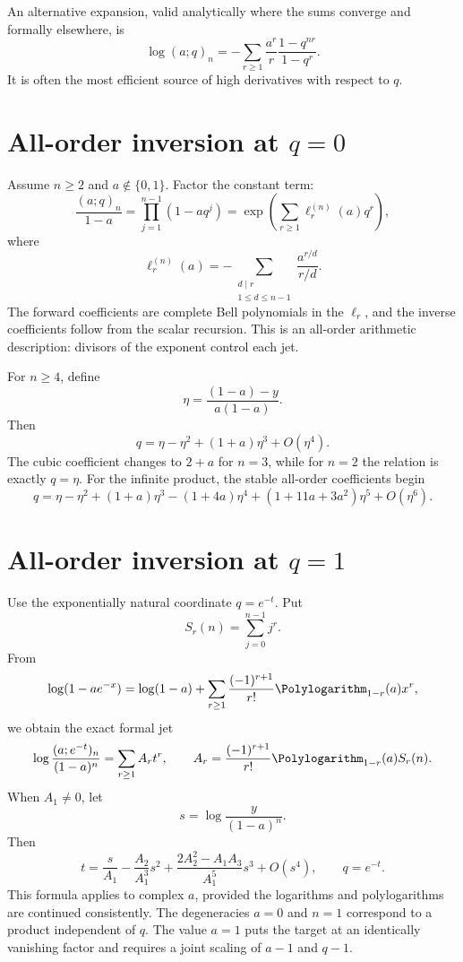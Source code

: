 \documentclass[11pt,letterpaper,oneside,openany]{book}
\theoremstyle{definition}
\theoremstyle{remark}
\begin{document}
An alternative expansion, valid analytically where the sums converge and
formally elsewhere, is
\begin{equation}\label{eq:finite-lambert}
 \log(a;q)_n=-\sum_{r\ge1}\frac{a^r}{r}
 \frac{1-q^{nr}}{1-q^r}.
\end{equation}
It is often the most efficient source of high derivatives with respect to
\(q\).

\section{All-order inversion at \texorpdfstring{\(q=0\)}{q=0}}
Assume \(n\ge2\) and \(a\notin\{0,1\}\).  Factor the constant term:
\[
 \frac{(a;q)_n}{1-a}=\prod_{j=1}^{n-1}(1-aq^j)
 =\exp\left(\sum_{r\ge1}\ell_r^{(n)}(a)q^r\right),
\]
where
\begin{equation}\label{eq:q0-logcoeff}
 \ell_r^{(n)}(a)
 =-\sum_{\substack{d\mid r\\1\le d\le n-1}}
 \frac{a^{r/d}}{r/d}.
\end{equation}
The forward coefficients are complete Bell polynomials in the \(\ell_r\), and
the inverse coefficients follow from the scalar recursion.  This is an
all-order arithmetic description: divisors of the exponent control each jet.

For \(n\ge4\), define
\[
 \eta=\frac{(1-a)-y}{a(1-a)}.
\]
Then
\begin{equation}\label{eq:q0-finite-inverse}
 q=\eta-\eta^2+(1+a)\eta^3+O(\eta^4).
\end{equation}
The cubic coefficient changes to \(2+a\) for \(n=3\), while for \(n=2\) the
relation is exactly \(q=\eta\).  For the infinite product, the stable
all-order coefficients begin
\begin{equation}\label{eq:q0-infinite-inverse-preview}
 q=\eta-\eta^2+(1+a)\eta^3-(1+4a)\eta^4
 +(1+11a+3a^2)\eta^5+O(\eta^6).
\end{equation}

\section{All-order inversion at \texorpdfstring{\(q=1\)}{q=1}}
Use the exponentially natural coordinate \(q=e^{-t}\).  Put
\[
 S_r(n)=\sum_{j=0}^{n-1}j^r.
\]
From
\[
 \log(1-ae^{-x})
 =\log(1-a)+\sum_{r\ge1}
 \frac{(-1)^{r+1}}{r!}\Polylogarithm_{1-r}(a)x^r,
\]
we obtain the exact formal jet
\begin{equation}\label{eq:finite-q1-forward}
 \log\frac{(a;e^{-t})_n}{(1-a)^n}
 =\sum_{r\ge1}A_rt^r,
 \qquad
 A_r=\frac{(-1)^{r+1}}{r!}\Polylogarithm_{1-r}(a)S_r(n).
\end{equation}
When \(A_1\ne0\), let
\[
 s=\log\frac{y}{(1-a)^n}.
\]
Then
\begin{equation}\label{eq:finite-q1-inverse}
 t=\frac{s}{A_1}-\frac{A_2}{A_1^3}s^2
 +\frac{2A_2^2-A_1A_3}{A_1^5}s^3+O(s^4),
 \qquad q=e^{-t}.
\end{equation}
This formula applies to complex \(a\), provided the logarithms and
polylogarithms are continued consistently.  The degeneracies \(a=0\) and
\(n=1\) correspond to a product independent of \(q\).  The value \(a=1\)
puts the target at an identically vanishing factor and requires a joint scaling
of \(a-1\) and \(q-1\).
\end{document}
